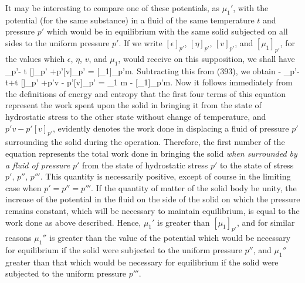 \documentclass[12pt]{article}
\begin{document}
{It may be interesting to compare one of these potentials, as $\mu_1'$, with the potential (for the same substance) in a fluid of the same temperature $t$ and pressure $p'$ which would be in equilibrium with the same solid subjected on all sides to the uniform pressure $p'$. If we write $[\epsilon]_{p'}$, $[\eta]_{p'}$, $[v]_{p'}$, and $[\mu_1]_{p'}$, for the values which $\epsilon$, $\eta$, $v$, and $\mu_1$, would receive on this supposition, we shall have
\eqs \left[\epsilon\right]_{p'}- t [\eta]_{p'} +p'[v]_{p'} = [\mu_1]_{p'}m.  \label{396}\eqe
Subtracting this from (393), we obtain
\eqs \epsilon - \left[\epsilon\right]_{p'}- t\eta+t [\eta]_{p'} +p'v - p'[v]_{p'} = \mu_1 m - [\mu_1]_{p'}m. \label{397}\eqe
Now it follows immediately from the definitions of energy and entropy that the first four terms of this equation represent the work spent upon the solid in bringing it from the state of hydrostatic stress to the other state without change of temperature, and $p'v-p'[v]_{p'}$, evidently denotes the work done in displacing a fluid of pressure $p'$ surrounding the solid during the operation. Therefore, the first number of the equation represents the total work done in bringing the solid \textit{when surrounded by a fluid of pressure} $p'$ from the state of hydrostatic stress $p'$ to the state of stress $p'$, $p''$, $p'''$. This quantity is necessarily positive, except of course in the limiting case when $p'=p''=p'''$. If the quantity of matter of the solid body be unity, the increase of the potential in the fluid on the side of the solid on which the pressure remains constant, which will be necessary to maintain equilibrium, is equal to the work done as above described. Hence, $\mu_1'$ is greater than $[\mu_1]_{p'}$, and for similar reasons $\mu_1''$ is greater than the value of the potential which would be necessary for equilibrium if the solid were subjected to the uniform pressure $p''$, and $\mu_1''$ greater than that which would be necessary for equilibrium if the solid were subjected to the uniform pressure $p'''$. 
}
\end{document}
